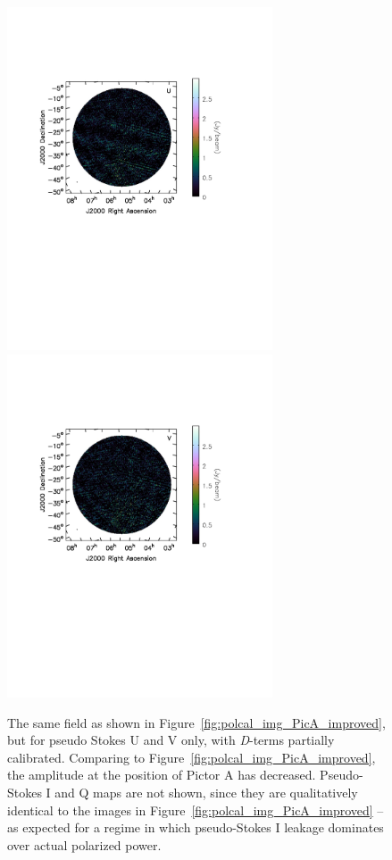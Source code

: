 \begin{figure}
\centering
\includegraphics[clip, trim=0.5cm 11cm 4cm 5cm, width=0.7\textwidth]{chapters/polcal/figures/6830-U-better-dcal.pdf}
\includegraphics[clip, trim=0.5cm 11cm 4cm 5cm, width=0.7\textwidth]{chapters/polcal/figures/6830-V-better-dcal.pdf}
\caption[The same field as shown in Figure~\ref{fig:polcal_img_PicA_improved}, but for pseudo Stokes U and V only, with \textit{D}-terms partially calibrated.]{The same field as shown in Figure~\ref{fig:polcal_img_PicA_improved}, but for pseudo Stokes U and V only, with \textit{D}-terms partially calibrated. Comparing to Figure~\ref{fig:polcal_img_PicA_improved}, the amplitude at the position of Pictor A has decreased. Pseudo-Stokes I and Q maps are not shown, since they are qualitatively identical to the images in Figure~\ref{fig:polcal_img_PicA_improved} -- as expected for a regime in which pseudo-Stokes I leakage dominates over actual polarized power.}
\label{fig:polcal_img_PicA_improved_dterm}
\end{figure}



